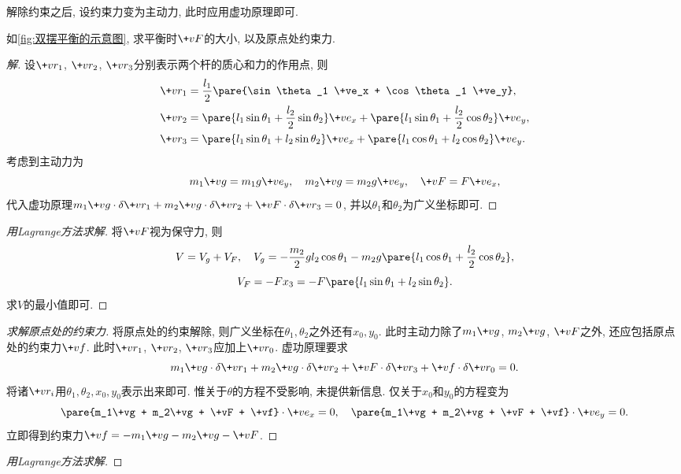 \documentclass{ctexart}
\begin{document}
解除约束之后, 设约束力变为主动力, 此时应用虚功原理即可.
\begin{sample}
    \begin{ex}
        \label{ex:双摆平衡}
        如\cref{fig:双摆平衡的示意图}, 求平衡时$\+vF$的大小, 以及原点处约束力.
    \end{ex}
    \begin{proof}[解]
        设$\+vr_1$, $\+vr_2$, $\+vr_3$分别表示两个杆的质心和力的作用点, 则
        \begin{align*}
            \+vr_1 &= \frac{l_1}{2} \pare{\sin\theta_1 \+ve_x + \cos\theta_1 \+ve_y}, \\
            \+vr_2 &= \pare{l_1\sin\theta_1 + \frac{l_2}{2}\sin\theta_2}\+ve_x + \pare{l_1\sin\theta_1 + \frac{l_2}{2}\cos\theta_2}\+ve_y, \\
            \+vr_3 &= \pare{l_1 \sin\theta_1 + l_2\sin\theta_2}\+ve_x + \pare{l_1\cos\theta_1 + l_2\cos\theta_2}\+ve_y.
        \end{align*}
        考虑到主动力为
        \[ m_1 \+vg = m_1g\+ve_y,\quad m_2 \+vg = m_2 g\+ve_y,\quad \+vF = F\+ve_x, \]
        代入虚功原理$m_1 \+vg\cdot\delta\+vr_1 + m_2 \+vg\cdot\delta \+vr_2 + \+vF\cdot\delta\+vr_3 = 0$, 并以$\theta_1$和$\theta_2$为广义坐标即可.
    \end{proof}
    \begin{proof}[用Lagrange方法求解]
        将$\+vF$视为保守力, 则
        \[ V = V_g + V_F,\quad V_g = -\frac{m_2}{2}gl_2\cos\theta_1 - m_2 g\pare{l_1 \cos\theta_1 + \frac{l_2}{2}\cos\theta_2}, \]
        \[ V_F = -Fx_3 = -F\pare{l_1\sin\theta_1 + l_2\sin\theta_2}. \]
        求$V$的最小值即可.
    \end{proof}
    \begin{proof}[求解原点处的约束力]
        将原点处的约束解除, 则广义坐标在$\theta_1, \theta_2$之外还有$x_0, y_0$. 此时主动力除了$m_1\+vg$, $m_2\+vg$, $\+vF$之外, 还应包括原点处的约束力$\+vf$. 此时$\+vr_1$, $\+vr_2$, $\+vr_3$应加上$\+vr_0$. 虚功原理要求
        \[ m_1\+vg\cdot\delta \+vr_1 + m_2 \+vg\cdot\delta \+vr_2 + \+vF\cdot\delta\+vr_3 + \+vf\cdot\delta\+vr_0 = 0. \]
        将诸$\+vr_i$用$\theta_1,\theta_2,x_0,y_0$表示出来即可. 惟关于$\theta$的方程不受影响, 未提供新信息. 仅关于$x_0$和$y_0$的方程变为
        \[ \pare{m_1\+vg + m_2\+vg + \+vF + \+vf} \cdot \+ve_x = 0,\quad \pare{m_1\+vg + m_2\+vg + \+vF + \+vf} \cdot \+ve_y = 0. \]
        立即得到约束力$\+vf = -m_1\+vg - m_2\+vg - \+vF$.
    \end{proof}
    \begin{proof}[用Lagrange方法求解]

\end{proof}
\end{sample}
\end{document}
